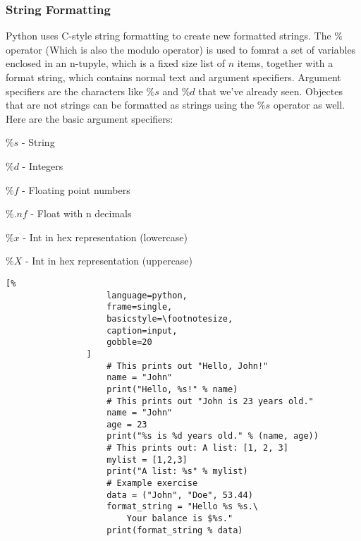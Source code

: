 \documentclass[crop=false,class=article,oneside]{standalone}
\begin{document}
        \subsubsection{String Formatting}
            Python uses C-style string formatting to create new
            formatted strings. The $\%$ operator (Which is also the
            modulo operator) is used to fomrat a set of variables
            enclosed in an n-tupyle, which is a fixed size list of
            $n$ items, together with a format string, which contains
            normal text and argument specifiers. Argument specifiers
            are the characters like $\%s$ and $\%d$ that we've
            already seen. Objectes that are not strings can be
            formatted as strings using the $\%s$ operator as well.
            Here are the basic argument specifiers:
            \begin{itemize}
                \begin{multicols}{2}
                    \item $\%s$ - String
                    \item $\%d$ - Integers
                    \item $\%f$ - Floating point numbers
                    \item $\%.nf$ - Float with n decimals
                    \item $\%x$ - Int in hex representation
                        (lowercase)
                    \item $\%X$ - Int in hex representation
                        (uppercase)
                \end{multicols}
            \end{itemize}
            \begin{minipage}[t]{.48\textwidth}
                \centering
                \begin{lstlisting}[%
                    language=python,
                    frame=single,
                    basicstyle=\footnotesize,
                    caption=input,
                    gobble=20
                ]
                    # This prints out "Hello, John!"
                    name = "John"
                    print("Hello, %s!" % name)
                    # This prints out "John is 23 years old."
                    name = "John"
                    age = 23
                    print("%s is %d years old." % (name, age))
                    # This prints out: A list: [1, 2, 3]
                    mylist = [1,2,3]
                    print("A list: %s" % mylist)
                    # Example exercise
                    data = ("John", "Doe", 53.44)
                    format_string = "Hello %s %s.\ 
                        Your balance is $%s."
                    print(format_string % data)

                \end{lstlisting}
            \end{minipage}\hfill
\end{document}
